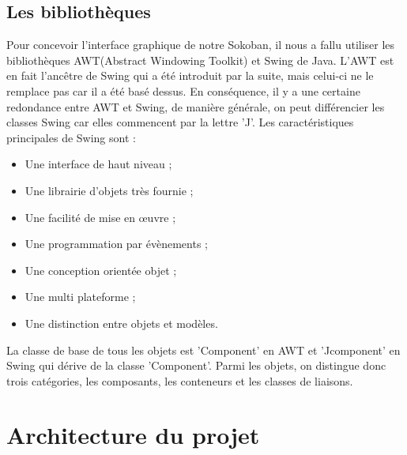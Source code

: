 \documentclass[a4paper,12pt]{article} %
\begin{document}
\subsection{Les bibliothèques}
Pour concevoir l'interface graphique de notre Sokoban, il nous a fallu utiliser les bibliothèques AWT(Abstract Windowing Toolkit) et Swing de Java. L'AWT est en fait l'ancêtre de Swing qui a été introduit par la suite, mais celui-ci ne le remplace pas car il a été basé dessus. En conséquence, il y a une certaine redondance entre AWT et Swing, de manière générale, on peut différencier les classes Swing car elles commencent par la lettre 'J'.
Les caractéristiques principales de Swing sont :
\begin{itemize}
\item Une interface de haut niveau ;
\item Une librairie d'objets très fournie ;
\item Une facilité de mise en œuvre ;
\item Une programmation par évènements ;
\item Une conception orientée objet ;
\item Une multi plateforme ;
\item Une distinction entre objets et modèles.
\end{itemize}
La classe de base de tous les objets est 'Component' en AWT et 'Jcomponent' en Swing qui dérive de la classe 'Component'. Parmi les objets, on distingue donc trois catégories, les composants, les conteneurs et les classes de liaisons.
\section{Architecture du projet}
\end{document}
